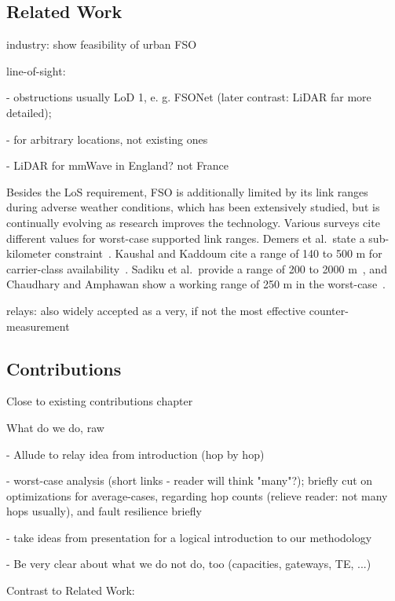 \documentclass[conference]{IEEEtran}
\begin{document}
    

    \subsection*{Related Work}\label{subsec:related-work}
    industry: show feasibility of urban FSO

    line-of-sight:

    - obstructions usually LoD 1, e. g. FSONet (later contrast: LiDAR far more detailed);

    - for arbitrary locations, not existing ones

    - LiDAR for mmWave in England? not France

    Besides the LoS requirement, FSO is additionally limited by its link ranges during adverse weather conditions, which has been extensively studied, but is continually evolving as research improves the technology.
    Various surveys cite different values for worst-case supported link ranges.
    Demers et al.~state a sub-kilometer constraint~\cite{fsobackhaul}.
    Kaushal and Kaddoum cite a range of 140 to 500 m for carrier-class availability~\cite{fsochallenges}.
    Sadiku et al.~provide a range of 200 to 2000 m~\cite{fsooverview}, and Chaudhary and Amphawan show a working range of 250 m in the worst-case~\cite{fsorole}.

    relays: also widely accepted as a very, if not the most effective counter-measurement

    \subsection*{Contributions}\label{subsec:contributions2}
    Close to existing contributions chapter

    What do we do, raw

    - Allude to relay idea from introduction (hop by hop)

    - worst-case analysis (short links - reader will think "many"?); briefly cut on optimizations for average-cases, regarding hop counts (relieve reader: not many hops usually), and fault resilience briefly

    - take ideas from presentation for a logical introduction to our methodology

    - Be very clear about what we do not do, too (capacities, gateways, TE, ...)

    Contrast to Related Work:
\end{document}
